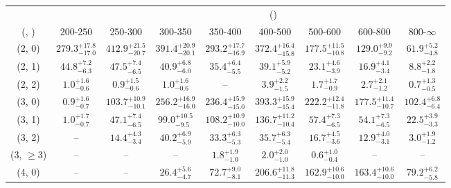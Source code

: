 \begin{table}[h!]
\tiny
\centering
{}
\begin{tabular}
{ccccccccc}
	\hline\hline
&	& \multicolumn{8}{c}{\scalht (\gev)} \\ 
	 (\njet,  \nb) & 200-250 & 250-300 & 300-350 & 350-400 & 400-500 & 500-600 & 600-800 & 800-$\infty$ \\ [0.8ex] 
\hline
	(2, 0) & $279.3^{+ 17.8 }_{- 17.0 }$ & $412.9^{+ 21.5 }_{- 20.7 }$ & $391.4^{+ 20.9 }_{- 20.1 }$ & $293.2^{+ 17.7 }_{- 16.9 }$ & $372.4^{+ 16.4 }_{- 15.8 }$ & $177.5^{+ 11.5 }_{- 10.8 }$ & $129.0^{+ 9.9 }_{- 9.2 }$ & $61.9^{+ 5.2 }_{- 4.8 }$ \\[0.5ex] 
	(2, 1) & $44.8^{+ 7.2 }_{- 6.3 }$ & $47.5^{+ 7.4 }_{- 6.5 }$ & $40.9^{+ 6.8 }_{- 6.0 }$ & $35.4^{+ 6.4 }_{- 5.5 }$ & $39.1^{+ 5.9 }_{- 5.2 }$ & $23.1^{+ 4.6 }_{- 3.9 }$ & $16.9^{+ 4.1 }_{- 3.4 }$ & $8.8^{+ 2.2 }_{- 1.8 }$ \\[0.5ex] 
	(2, 2) & $1.0^{+ 1.6 }_{- 0.6 }$ & $0.9^{+ 1.5 }_{- 0.6 }$ & $1.0^{+ 1.6 }_{- 0.6 }$ & -- & $3.9^{+ 2.2 }_{- 1.5 }$ & $1.7^{+ 1.7 }_{- 0.9 }$ & $2.7^{+ 2.1 }_{- 1.2 }$ & $0.7^{+ 1.3 }_{- 0.5 }$ \\[0.5ex] 
	(3, 0) & $0.9^{+ 1.6 }_{- 0.7 }$ & $103.7^{+ 10.9 }_{- 10.1 }$ & $256.2^{+ 16.9 }_{- 16.0 }$ & $236.4^{+ 15.9 }_{- 15.0 }$ & $393.3^{+ 15.9 }_{- 15.4 }$ & $222.2^{+ 12.4 }_{- 11.8 }$ & $177.5^{+ 11.4 }_{- 10.7 }$ & $102.4^{+ 6.8 }_{- 6.4 }$ \\[0.5ex] 
	(3, 1) & $1.0^{+ 1.7 }_{- 0.7 }$ & $47.1^{+ 7.4 }_{- 6.5 }$ & $99.0^{+ 10.5 }_{- 9.5 }$ & $108.2^{+ 10.9 }_{- 10.0 }$ & $136.7^{+ 11.2 }_{- 10.4 }$ & $57.4^{+ 7.3 }_{- 6.5 }$ & $54.1^{+ 7.3 }_{- 6.5 }$ & $22.5^{+ 3.9 }_{- 3.3 }$ \\[0.5ex] 
	(3, 2) & -- & $14.4^{+ 4.3 }_{- 3.4 }$ & $40.2^{+ 6.9 }_{- 5.9 }$ & $33.3^{+ 6.3 }_{- 5.3 }$ & $35.7^{+ 6.3 }_{- 5.4 }$ & $16.7^{+ 4.5 }_{- 3.6 }$ & $12.9^{+ 4.0 }_{- 3.1 }$ & $3.0^{+ 1.9 }_{- 1.2 }$ \\[0.5ex] 
	(3, $\ge3$) & -- & -- & -- & $1.8^{+ 1.9 }_{- 1.0 }$ & $2.0^{+ 2.0 }_{- 1.0 }$ & $0.6^{+ 1.0 }_{- 0.4 }$ & -- & -- \\[0.5ex] 
	(4, 0) & -- & -- & $26.4^{+ 5.6 }_{- 4.7 }$ & $72.7^{+ 9.0 }_{- 8.1 }$ & $206.6^{+ 11.8 }_{- 11.3 }$ & $162.9^{+ 10.6 }_{- 10.0 }$ & $163.4^{+ 10.6 }_{- 10.0 }$ & $79.2^{+ 6.2 }_{- 5.8 }$ \\[0.5ex] 

\end{tabular}
\end{table}
